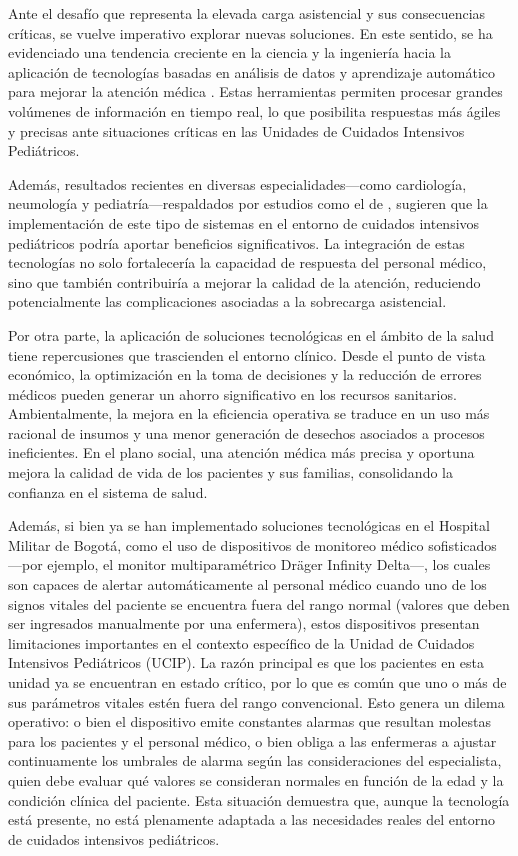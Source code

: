 Ante el desafío que representa la elevada carga asistencial y sus consecuencias críticas, se vuelve imperativo explorar nuevas soluciones. En este sentido, se ha evidenciado una tendencia creciente en la ciencia y la ingeniería hacia la aplicación de tecnologías basadas en análisis de datos y aprendizaje automático para mejorar la atención médica \parencite{Davenport2019}. Estas herramientas permiten procesar grandes volúmenes de información en tiempo real, lo que posibilita respuestas más ágiles y precisas ante situaciones críticas en las Unidades de Cuidados Intensivos Pediátricos.

Además, resultados recientes en diversas especialidades—como cardiología, neumología y pediatría—respaldados por estudios como el de \textcite{Karalis2024}, sugieren que la implementación de este tipo de sistemas en el entorno de cuidados intensivos pediátricos podría aportar beneficios significativos. La integración de estas tecnologías no solo fortalecería la capacidad de respuesta del personal médico, sino que también contribuiría a mejorar la calidad de la atención, reduciendo potencialmente las complicaciones asociadas a la sobrecarga asistencial.

Por otra parte, la aplicación de soluciones tecnológicas en el ámbito de la salud tiene repercusiones que trascienden el entorno clínico. Desde el punto de vista económico, la optimización en la toma de decisiones y la reducción de errores médicos pueden generar un ahorro significativo en los recursos sanitarios. Ambientalmente, la mejora en la eficiencia operativa se traduce en un uso más racional de insumos y una menor generación de desechos asociados a procesos ineficientes. En el plano social, una atención médica más precisa y oportuna mejora la calidad de vida de los pacientes y sus familias, consolidando la confianza en el sistema de salud.

Además, si bien ya se han implementado soluciones tecnológicas en el Hospital Militar de Bogotá, como el uso de dispositivos de monitoreo médico sofisticados —por ejemplo, el monitor multiparamétrico Dräger Infinity Delta—, los cuales son capaces de alertar automáticamente al personal médico cuando uno de los signos vitales del paciente se encuentra fuera del rango normal (valores que deben ser ingresados manualmente por una enfermera), estos dispositivos presentan limitaciones importantes en el contexto específico de la Unidad de Cuidados Intensivos Pediátricos (UCIP). La razón principal es que los pacientes en esta unidad ya se encuentran en estado crítico, por lo que es común que uno o más de sus parámetros vitales estén fuera del rango convencional. Esto genera un dilema operativo: o bien el dispositivo emite constantes alarmas que resultan molestas para los pacientes y el personal médico, o bien obliga a las enfermeras a ajustar continuamente los umbrales de alarma según las consideraciones del especialista, quien debe evaluar qué valores se consideran normales en función de la edad y la condición clínica del paciente. Esta situación demuestra que, aunque la tecnología está presente, no está plenamente adaptada a las necesidades reales del entorno de cuidados intensivos pediátricos.